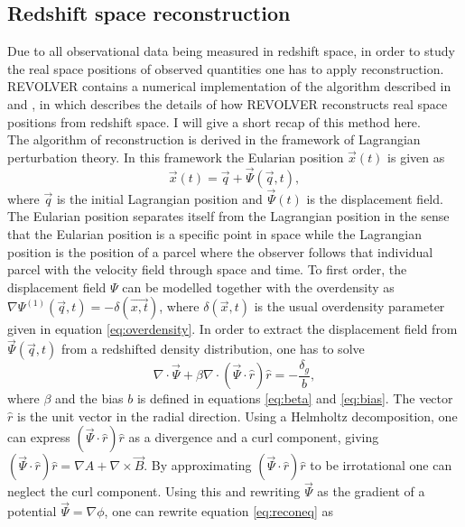 \subsection{Redshift space reconstruction}\label{sec:reconstruction}
Due to all observational data being measured in redshift space, in order to study
the real space positions of observed quantities one has to apply reconstruction. REVOLVER contains a numerical implementation of
the algorithm described in \cite{Nadathur_2018} and \cite{Burden_reconstruction}, in which describes the details
of how REVOLVER reconstructs real space positions from redshift space. I will give a
short recap of this method here.\\\indent
The algorithm of reconstruction is derived in the framework of Lagrangian
perturbation theory. In this framework the Eularian position $\vec{x}(t)$ is
given as
\begin{equation}
    \vec{x}(t)=\vec{q}+\vec{\Psi}(\vec{q},t),
\end{equation}
where $\vec{q}$ is the initial Lagrangian position and $\vec{\Psi}(t)$ is the
displacement field. The Eularian position separates itself from the Lagrangian
position in the sense that the Eularian position is a specific point in space
while the Lagrangian position is the position of a parcel where the observer
follows that individual parcel with the velocity field through space and time.
To first order, the displacement field $\Psi$ can be modelled together with the
overdensity as $\nabla\Psi^{(1)}(\vec{q},t)=-\delta(\vec{x,t})$, where
$\delta(\vec{x},t)$ is the usual overdensity parameter given in equation \ref{eq:overdensity}.
In order to extract the displacement field from $\vec{\Psi}(\vec{q},t)$ from a
redshifted density distribution, one has to solve \cite{recondisplace}
\begin{equation}\label{eq:reconeq}
    \nabla\cdot\vec{\Psi}+\beta\nabla\cdot(\vec{\Psi}\cdot\hat{r})\hat{r}=-\frac{\delta_g}{b},
\end{equation}
where $\beta$ and the bias $b$ is defined in equations
\ref{eq:beta} and \ref{eq:bias}. The vector $\hat{r}$ is the unit vector in the radial direction. Using a Helmholtz decomposition, one can
express $(\vec{\Psi}\cdot\hat{r})\hat{r}$ as a divergence and a curl component, giving $(\vec{\Psi}\cdot\hat{r})\hat{r}=\nabla A + \nabla \times \vec{B}$.
By approximating $(\vec{\Psi}\cdot\hat{r})\hat{r}$ to be irrotational one can neglect
the curl component.
Using this and rewriting $\vec{\Psi}$ as the gradient of a
potential $\vec{\Psi}=\nabla\phi$, one can rewrite equation \ref{eq:reconeq} as
